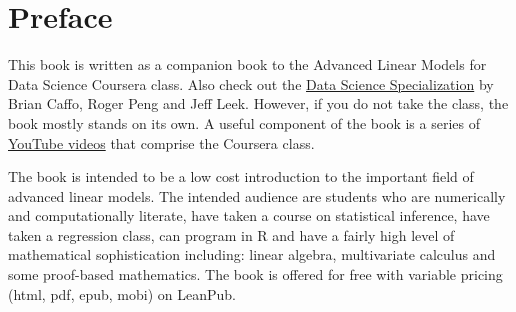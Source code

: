\chapter*{Preface}

This book is written as a companion book to the
Advanced Linear Models for Data Science
Coursera class. Also check out the \href{https://www.coursera.org/specialization/jhudatascience/1}{Data Science Specialization} by Brian Caffo, Roger Peng and Jeff Leek. However, if you do not take the class, the book mostly stands on its own. A
useful component of the book is a series of \href{https://youtu.be/TrZdG642M4g}{YouTube videos} that comprise the Coursera class.

The book is intended to be a low cost introduction to the important field of
advanced linear models. The intended audience are students who are numerically
and computationally literate, have taken a
course on statistical inference, have taken a regression class, can program in R
and have a fairly high level of mathematical sophistication including: linear algebra,
multivariate calculus and some proof-based mathematics.
The book is offered for free with variable pricing (html, pdf, epub, mobi) on
LeanPub.


